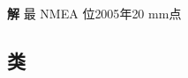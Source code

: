 \documentclass[11pt,a4paper]{article}
\numberwithin{equation}{section}
\numberwithin{figure}{section}
\begin{document}
\textbf{{\cjkfont 解}\allowbreak{}} {\cjkfont 最}\allowbreak{} NMEA {\cjkfont 位}\allowbreak{}2005{\cjkfont 年}\allowbreak{}20 mm{\cjkfont 点}\allowbreak{}

\subsection{{\cjkfont 类}\allowbreak{}}
\end{document}
